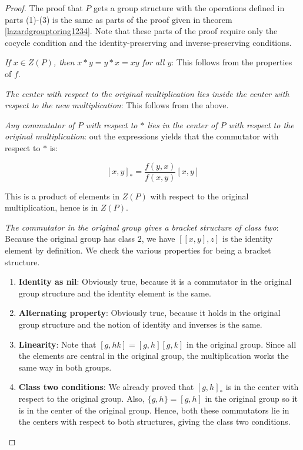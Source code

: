 \documentclass[10pt]{amsart}
\begin{document}
\begin{proof}
  The proof that $P$ gets a group structure with the operations
  defined in parts (1)-(3) is the same as parts of the proof given in
  theorem \ref{lazardgrouptoring1234}. Note that these parts of the
  proof require only the cocycle condition and the
  identity-preserving and inverse-preserving conditions.

  {\em If $x \in Z(P)$, then $x * y = y * x = xy$ for all $y$}: This
  follows from the properties of $f$.

  {\em The center with respect to the original multiplication lies
  inside the center with respect to the new multiplication}: This
  follows from the above.

  {\em Any commutator of $P$ with respect to $*$ lies in the center of
  $P$ with respect to the original multiplication}: out the
  expressions yields that the commutator with respect to $*$ is:

  $$[x,y]_{*} = \frac{f(y,x)}{f(x,y)}[x,y]$$

  This is a product of elements in $Z(P)$ with respect to the original
  multiplication, hence is in $Z(P)$.

  {\em The commutator in the original group gives a bracket structure
  of class two}: Because the original group has class $2$, we have
  $[[x,y],z]$ is the identity element by definition. We check the
  various properties for being a bracket structure.

  \begin{enumerate}
  \item {\bf Identity as nil}: Obviously true, because it is a
    commutator in the original group structure and the identity element is the same.
  \item {\bf Alternating property}: Obviously true, because it holds
    in the original group structure and the notion of identity and
    inverses is the same.
  \item {\bf Linearity}: Note that $[g,hk] = [g,h][g,k]$ in the
    original group. Since all the elements are central in the original
    group, the multiplication works the same way in both groups.
  \item {\bf Class two conditions}: We already proved that $[g,h]_{*}$
    is in the center with respect to the original group. Also, $\{ g,h
    \} = [g,h]$ in the original group so it is in the center of the
    original group. Hence, both these commutators lie in the centers
    with respect to both structures, giving the class two conditions.
  \end{enumerate}
\end{proof}
\end{document}
